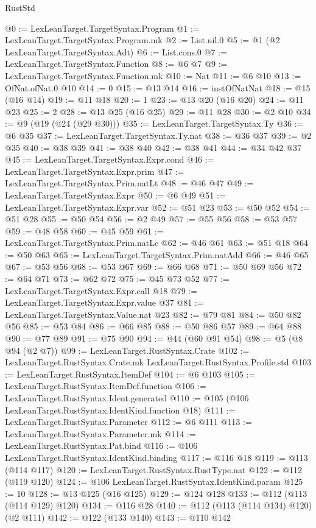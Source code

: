 \begin{lexlean}{RustStd}
\begin{coremodule}
@0 := LexLeanTarget.TargetSyntax.Program
@1 := LexLeanTarget.TargetSyntax.Program.mk
@2 := List.nil.{0}
@5 := @1 (@2 LexLeanTarget.TargetSyntax.Adt)
@6 := List.cons.{0}
@7 := LexLeanTarget.TargetSyntax.Function
@8 := @6 @7
@9 := LexLeanTarget.TargetSyntax.Function.mk
@10 := Nat
@11 := @6 @10
@13 := OfNat.ofNat.{0} @10
@14 := 0
@15 := @13 @14
@16 := instOfNatNat
@18 := @15 (@16 @14)
@19 := @11 @18
@20 := 1
@23 := @13 @20 (@16 @20)
@24 := @11 @23
@25 := 2
@28 := @13 @25 (@16 @25)
@29 := @11 @28
@30 := @2 @10
@34 := @9 (@19 (@24 (@29 @30)))
@35 := LexLeanTarget.TargetSyntax.Ty
@36 := @6 @35
@37 := LexLeanTarget.TargetSyntax.Ty.nat
@38 := @36 @37
@39 := @2 @35
@40 := @38 @39
@41 := @38 @40
@42 := @38 @41
@44 := @34 @42 @37
@45 := LexLeanTarget.TargetSyntax.Expr.cond
@46 := LexLeanTarget.TargetSyntax.Expr.prim
@47 := LexLeanTarget.TargetSyntax.Prim.natLt
@48 := @46 @47
@49 := LexLeanTarget.TargetSyntax.Expr
@50 := @6 @49
@51 := LexLeanTarget.TargetSyntax.Expr.var
@52 := @51 @23
@53 := @50 @52
@54 := @51 @28
@55 := @50 @54
@56 := @2 @49
@57 := @55 @56
@58 := @53 @57
@59 := @48 @58
@60 := @45 @59
@61 := LexLeanTarget.TargetSyntax.Prim.natLe
@62 := @46 @61
@63 := @51 @18
@64 := @50 @63
@65 := LexLeanTarget.TargetSyntax.Prim.natAdd
@66 := @46 @65
@67 := @53 @56
@68 := @53 @67
@69 := @66 @68
@71 := @50 @69 @56
@72 := @64 @71
@73 := @62 @72
@75 := @45 @73 @52
@77 := LexLeanTarget.TargetSyntax.Expr.call @18
@79 := LexLeanTarget.TargetSyntax.Expr.value @37
@81 := LexLeanTarget.TargetSyntax.Value.nat @23
@82 := @79 @81
@84 := @50 @82 @56
@85 := @53 @84
@86 := @66 @85
@88 := @50 @86 @57
@89 := @64 @88
@90 := @77 @89
@91 := @75 @90
@94 := @44 (@60 @91 @54)
@98 := @5 (@8 @94 (@2 @7))
@99 := LexLeanTarget.RustSyntax.Crate
@102 := LexLeanTarget.RustSyntax.Crate.mk LexLeanTarget.RustSyntax.Profile.std
@103 := LexLeanTarget.RustSyntax.ItemDef
@104 := @6 @103
@105 := LexLeanTarget.RustSyntax.ItemDef.function
@106 := LexLeanTarget.RustSyntax.Ident.generated
@110 := @105 (@106 LexLeanTarget.RustSyntax.IdentKind.function @18)
@111 := LexLeanTarget.RustSyntax.Parameter
@112 := @6 @111
@113 := LexLeanTarget.RustSyntax.Parameter.mk
@114 := LexLeanTarget.RustSyntax.Pat.bind
@116 := @106 LexLeanTarget.RustSyntax.IdentKind.binding
@117 := @116 @18
@119 := @113 (@114 @117)
@120 := LexLeanTarget.RustSyntax.RustType.nat
@122 := @112 (@119 @120)
@124 := @106 LexLeanTarget.RustSyntax.IdentKind.param
@125 := 10
@128 := @13 @125 (@16 @125)
@129 := @124 @128
@133 := @112 (@113 (@114 @129) @120)
@134 := @116 @28
@140 := @112 (@113 (@114 @134) @120) (@2 @111)
@142 := @122 (@133 @140)
@143 := @110 @142

\end{coremodule}
\end{lexlean}
